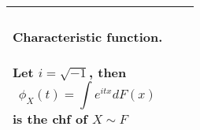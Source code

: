 \documentclass{formula-sheet}
\begin{document}
\begin{landscape}
\begin{tabular}[t]{|l|l|l|}
\begin{minipage}[t]{0.315\linewidth}
\smallskip

\paragraph{Characteristic function.} Let $i = \sqrt{-1}$, then
%
\begin{displaymath}
\phi_X(t) = \int e^{itx} dF(x)
\end{displaymath}
%
is the chf of $X \sim F$
\medskip


\vspace{17.25cm}

\end{minipage}

\\ \hline
\end{tabular}


\end{landscape}
\end{document}
